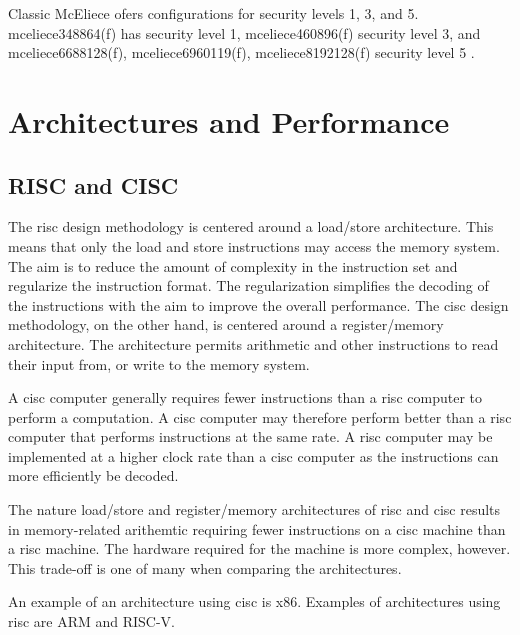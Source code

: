 Classic McEliece ofers configurations for security levels 1, 3, and 5. mceliece348864(f) has security level 1, mceliece460896(f) security level 3, and mceliece6688128(f), mceliece6960119(f), mceliece8192128(f) security level 5 \cite{mceliece2020}.

\section{Architectures and Performance}


\subsection{RISC and CISC}

The \acrfull{risc} design methodology is centered around a load/store architecture\cite{flynn1998}. This means that only the load and store instructions may access the memory system\cite{carter2002}. The aim is to reduce the amount of complexity in the instruction set and regularize the instruction format. The regularization simplifies the decoding of the instructions with the aim to improve the overall performance\cite{flynn1998}. The \acrfull{cisc} design methodology, on the other hand, is centered around a register/memory architecture\cite{flynn1998}. The architecture permits arithmetic and other instructions to read their input from, or write to the memory system\cite{carter2002}.

A \gls{cisc} computer generally requires fewer instructions than a \gls{risc} computer to perform a computation. A \gls{cisc} computer may therefore perform better than a \gls{risc} computer that performs instructions at the same rate. A \gls{risc} computer may be implemented at a higher clock rate than a \gls{cisc} computer as the instructions can more efficiently be decoded\cite{carter2002}.

The nature load/store and register/memory architectures of \gls{risc} and \gls{cisc} results in memory-related arithemtic requiring fewer instructions on a \gls{cisc} machine than a \gls{risc} machine. The hardware required for the machine is more complex, however. This trade-off is one of many when comparing the architectures\cite{carter2002}.

An example of an architecture using \gls{cisc} is \gls{x86}. Examples of architectures using \gls{risc} are ARM and RISC-V.

